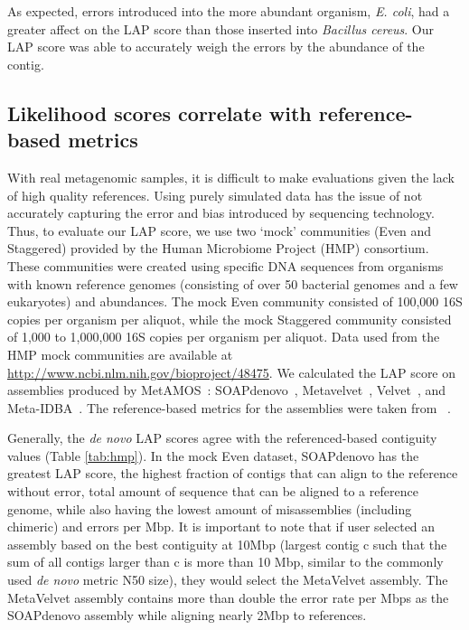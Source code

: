 \documentclass[conference]{IEEEtran}
\begin{document}
As expected, errors introduced into the more abundant organism, \emph{E. coli}, had a greater affect on the LAP score than those inserted into \emph{Bacillus cereus}.
Our LAP score was able to accurately weigh the errors by the abundance of the contig.

\subsection{Likelihood scores correlate with reference-based metrics}


With real metagenomic samples, it is difficult to make evaluations given the lack of high quality references.
Using purely simulated data has the issue of not accurately capturing the error and bias introduced by sequencing technology.
Thus, to evaluate our LAP score, we use two `mock' communities (Even and Staggered) provided by the Human Microbiome Project (HMP) consortium\cite{mitreva2012structure,methe2012framework}.
These communities were created using specific DNA sequences from organisms with known reference genomes (consisting of over 50 bacterial genomes and a few eukaryotes) and abundances.
The mock Even community consisted of 100,000 16S copies per organism per aliquot, while the mock Staggered community consisted of 1,000 to 1,000,000 16S copies per organism per aliquot.
Data used from the HMP mock communities are available at \url{http://www.ncbi.nlm.nih.gov/bioproject/48475}.
We calculated the LAP score on assemblies produced by MetAMOS~\cite{treangen2013metamos}: SOAPdenovo~\cite{SOAPdenovo}, Metavelvet~\cite{namiki2012metavelvet}, Velvet~\cite{Velvet}, and Meta-IDBA~\cite{peng2011meta}.
The reference-based metrics for the assemblies were taken from ~\cite{treangen2013metamos}.

Generally, the \emph{de novo} LAP scores agree with the referenced-based contiguity values (Table \ref{tab:hmp}).
In the mock Even dataset, SOAPdenovo has the greatest LAP score, the highest fraction of contigs that can align to the reference without error, total amount of sequence that can be aligned to a reference genome, while also having the lowest amount of misassemblies (including chimeric) and errors per Mbp.
It is important to note that if user selected an assembly based on the best contiguity at 10Mbp (largest contig c such that the sum of all contigs larger than c is more than 10 Mbp, similar to the commonly used \emph{de novo} metric N50 size), they would select the MetaVelvet assembly.
The MetaVelvet assembly contains more than double the error rate per Mbps as the SOAPdenovo assembly while aligning nearly 2Mbp to references.
\end{document}
